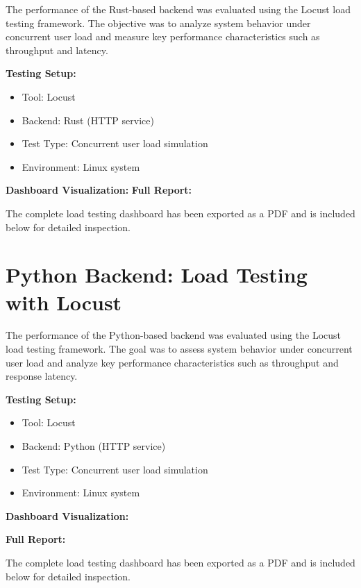 \documentclass[12pt]{article}
\begin{document}
The performance of the Rust-based backend was evaluated using the Locust load testing framework. The objective was to analyze system behavior under concurrent user load and measure key performance characteristics such as throughput and latency.

\textbf{Testing Setup:}
\begin{itemize}
    \item Tool: Locust
    \item Backend: Rust (HTTP service)
    \item Test Type: Concurrent user load simulation
    \item Environment: Linux system
\end{itemize}

\textbf{Dashboard Visualization:}
\textbf{Full Report:}

The complete load testing dashboard has been exported as a PDF and is included below for detailed inspection.





\section{Python Backend: Load Testing with Locust}

The performance of the Python-based backend was evaluated using the Locust load testing framework. The goal was to assess system behavior under concurrent user load and analyze key performance characteristics such as throughput and response latency.

\textbf{Testing Setup:}
\begin{itemize}
    \item Tool: Locust
    \item Backend: Python (HTTP service)
    \item Test Type: Concurrent user load simulation
    \item Environment: Linux system
\end{itemize}

\textbf{Dashboard Visualization:}

\textbf{Full Report:}

The complete load testing dashboard has been exported as a PDF and is included below for detailed inspection.


\end{document}
